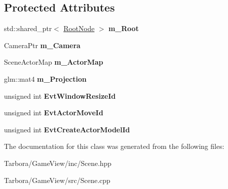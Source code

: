 \subsection*{Protected Attributes}
\begin{DoxyCompactItemize}
\item 
\mbox{\label{classTarbora_1_1Scene_aabd1a11a2b8bb7aedc3915e135c19f7a}} 
std\+::shared\+\_\+ptr$<$ \hyperlink{classTarbora_1_1RootNode}{Root\+Node} $>$ {\bfseries m\+\_\+\+Root}
\item 
\mbox{\label{classTarbora_1_1Scene_ab40b861574f5e22c2af86c83bffff312}} 
Camera\+Ptr {\bfseries m\+\_\+\+Camera}
\item 
\mbox{\label{classTarbora_1_1Scene_a2c08743f2a7414c748a5335274203e82}} 
Scene\+Actor\+Map {\bfseries m\+\_\+\+Actor\+Map}
\item 
\mbox{\label{classTarbora_1_1Scene_ab62af3e98c2ae7d0d5354de05fbc824e}} 
glm\+::mat4 {\bfseries m\+\_\+\+Projection}
\item 
\mbox{\label{classTarbora_1_1Scene_a6f18d252caf82e16954b903056e175f2}} 
unsigned int {\bfseries Evt\+Window\+Resize\+Id}
\item 
\mbox{\label{classTarbora_1_1Scene_aaedbac4e3c8a1b0e79d6dd742ebe8062}} 
unsigned int {\bfseries Evt\+Actor\+Move\+Id}
\item 
\mbox{\label{classTarbora_1_1Scene_a98f043244b083fa70be3bfb1837236b2}} 
unsigned int {\bfseries Evt\+Create\+Actor\+Model\+Id}
\end{DoxyCompactItemize}


The documentation for this class was generated from the following files\+:\begin{DoxyCompactItemize}
\item 
Tarbora/\+Game\+View/inc/Scene.\+hpp\item 
Tarbora/\+Game\+View/src/Scene.\+cpp\end{DoxyCompactItemize}
